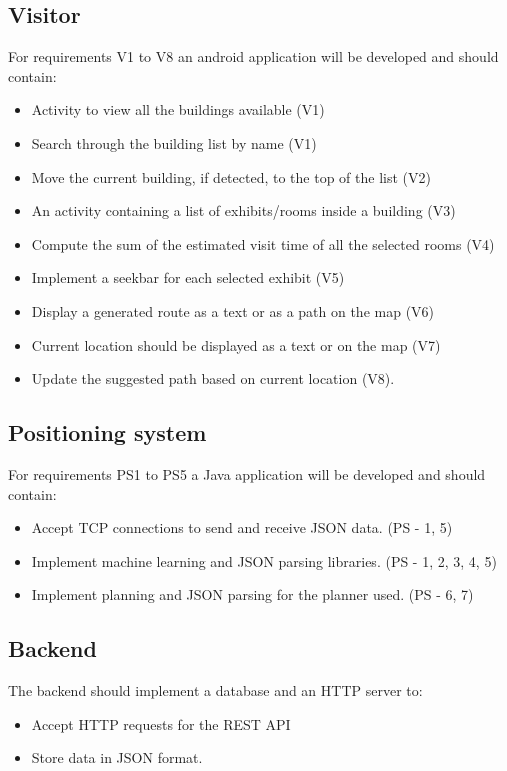 \subsection{Visitor}
For requirements V1 to V8 an android application will be developed and should contain:
	\begin{itemize}
		\item Activity to view all the buildings available (V1)
		\item Search through the building list by name (V1)
		\item Move the current building, if detected, to the top of the list (V2)
		\item An activity containing a list of exhibits/rooms inside a building (V3)
		\item Compute the sum of the estimated visit time of all the selected rooms (V4)
		\item Implement a seekbar for each selected exhibit (V5)
		\item Display a generated route as a text or as a path on the map (V6)
		\item Current location should be displayed as a text or on the map (V7)
		\item Update the suggested path based on current location (V8).
	\end{itemize}

\subsection{Positioning system}
For requirements PS1 to PS5 a Java application will be developed and should contain:
	\begin{itemize}
		\item Accept TCP connections to send and receive JSON data. (PS - 1, 5)
		\item Implement machine learning and JSON parsing libraries. (PS - 1, 2, 3, 4, 5)
		\item Implement planning and JSON parsing for the planner used. (PS - 6, 7)
	\end{itemize}

\subsection{Backend}
The backend should implement a database and an HTTP server to:
	\begin{itemize}
		\item Accept HTTP requests for the REST API
		\item Store data in JSON format.
	\end{itemize}

